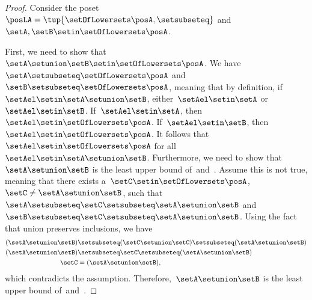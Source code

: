 \begin{proof}
    Consider the poset~$\posLA=\tup{\setOfLowersets \posA,\setsubseteq}$ and~$\setA,\setB\setin \setOfLowersets \posA$.

    First, we need to show that~$\setA\setunion \setB\setin \setOfLowersets \posA$.
    We have~$\setA \setsubseteq \setOfLowersets \posA$ and~$\setB\setsubseteq \setOfLowersets \posA$, meaning that by definition, if~$\setAel\setin \setA\setunion \setB$, either~$\setAel\setin \setA$ or~$\setAel\setin \setB$.
    If~$\setAel\setin \setA$, then~$\setAel\setin \setOfLowersets \posA$.
    If~$\setAel\setin \setB$, then~$\setAel\setin \setOfLowersets \posA$.
    It follows that~$\setAel\setin \setOfLowersets \posA$ for all~$\setAel\setin \setA\setunion \setB$.
    Furthermore, we need to show that~$\setA\setunion \setB$ is the least upper bound of~\setA and~\setB.
    Assume this is not true, meaning that there exists a~$\setC\setin \setOfLowersets \posA$,~$\setC\neq \setA\setunion \setB$, such that~$\setA\setsubseteq \setC\setsubseteq \setA\setunion \setB$ and~$\setB\setsubseteq \setC\setsubseteq \setA\setunion \setB$.
    Using the fact that union preserves inclusions, we have
    \begin{equation}
        \begin{aligned}
            (\setA\setunion \setB)
                                   & \setsubseteq (\setC\setunion \setC) \setsubseteq (\setA\setunion \setB) \\
            (\setA\setunion \setB) & \setsubseteq \setC \setsubseteq (\setA\setunion \setB) \\
            \setC                  & = (\setA\setunion \setB),
        \end{aligned}
    \end{equation}
    which contradicts the assumption.
    Therefore,~$\setA\setunion \setB$ is the least upper bound of~\setA and~\setB.


\end{proof}
